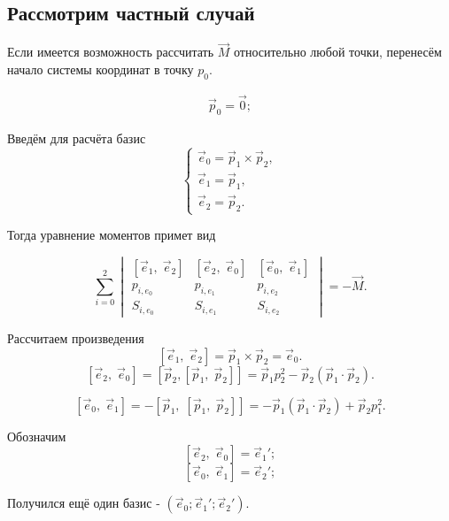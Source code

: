 \subsection{Рассмотрим частный случай}
Если имеется возможность рассчитать $\vec{M}$ относительно любой точки, перенесём начало системы координат в точку $p_0$.

\begin{align}
	\vec{p}_0 = \vec{0};
\end{align}

Введём для расчёта базис
\begin{equation}
	\left\{
		\begin{array}{l}
		\vec{e}_0 = \vec{p}_1 \times \vec{p}_2,\\
		\vec{e}_1 = \vec{p}_1,\\
		\vec{e}_2 = \vec{p}_2.
		\end{array}
	\right.
\end{equation}

Тогда уравнение моментов примет вид

\begin{equation}
	\sum\limits_{i=0}^2 
		\begin{vmatrix} 
		[ \vec e_1,\; \vec e_2 ] &  [ \vec e_2,\; \vec e_0 ] & [ \vec e_0,\; \vec e_1 ] \\ 
		p_{i,{e_0}} & p_{i,{e_1}} & p_{i,{e_2}} \\ 
		S_{i,{e_0}} & S_{i,{e_1}} & S_{i,{e_2}}
		\end{vmatrix}
		= -\vec{M}.
\end{equation}

Рассчитаем произведения
$$[ \vec e_1,\; \vec e_2 ] = \vec p_1 \times \vec p_2 = \vec e_0.$$
$$[ \vec e_2,\; \vec e_0 ] 
= [ \vec p_2, [ \vec p_1,\; \vec p_2 ] ] 
= \vec p_1 p_2^2 - \vec p_2 \left(\vec p_1 \cdot \vec p_2 \right).$$

$$[ \vec e_0,\; \vec e_1 ]
 = - [ \vec p_1,\; [ \vec p_1,\; \vec p_2 ] ]
 = - \vec p_1 \left(\vec p_1 \cdot \vec p_2 \right) + \vec p_2 p_1^2.$$
 
Обозначим
$$[ \vec e_2,\; \vec e_0 ] = \vec e_1';$$
$$[ \vec e_0,\; \vec e_1 ] = \vec e_2';$$

Получился ещё один базис - $\left( \vec e_0; \vec e_1'; \vec e_2' \right) $.

